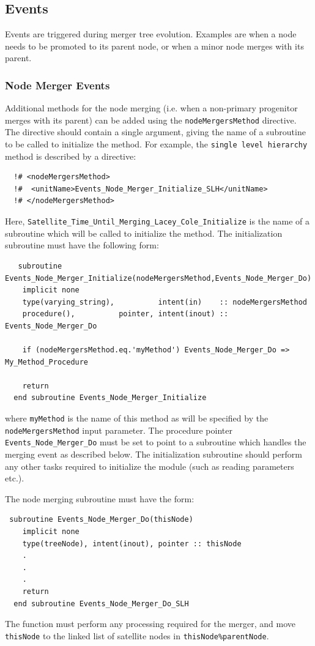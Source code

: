 \subsection{Events}

Events are triggered during merger tree evolution. Examples are when a node needs to be promoted to its parent node, or when a minor node merges with its parent.

\subsubsection{Node Merger Events}

Additional methods for the node merging (i.e. when a non-primary progenitor merges with its parent) can be added using the {\tt nodeMergersMethod} directive. The directive should contain a single argument, giving the name of a subroutine to be called to initialize the method. For example, the {\tt single level hierarchy} method is described by a directive:
\begin{verbatim}
  !# <nodeMergersMethod>
  !#  <unitName>Events_Node_Merger_Initialize_SLH</unitName>
  !# </nodeMergersMethod>
\end{verbatim}
Here, {\tt Satellite\_Time\_Until\_Merging\_Lacey\_Cole\_Initialize} is the name of a subroutine which will be called to initialize the method. The initialization subroutine must have the following form:
\begin{verbatim}
   subroutine Events_Node_Merger_Initialize(nodeMergersMethod,Events_Node_Merger_Do)
    implicit none
    type(varying_string),          intent(in)    :: nodeMergersMethod
    procedure(),          pointer, intent(inout) :: Events_Node_Merger_Do

    if (nodeMergersMethod.eq.'myMethod') Events_Node_Merger_Do => My_Method_Procedure

    return
  end subroutine Events_Node_Merger_Initialize
\end{verbatim}
where {\tt myMethod} is the name of this method as will be specified by the {\tt nodeMergersMethod} input parameter. The procedure pointer {\tt Events\_Node\_Merger\_Do} must be set to point to a subroutine which handles the merging event as described below. The initialization subroutine should perform any other tasks required to initialize the module (such as reading parameters etc.).

The node merging subroutine must have the form:
\begin{verbatim}
 subroutine Events_Node_Merger_Do(thisNode)
    implicit none
    type(treeNode), intent(inout), pointer :: thisNode
    .
    .
    .
    return
  end subroutine Events_Node_Merger_Do_SLH
\end{verbatim}
The function must perform any processing required for the merger, and move {\tt thisNode} to the linked list of satellite nodes in {\tt thisNode\%parentNode}.

